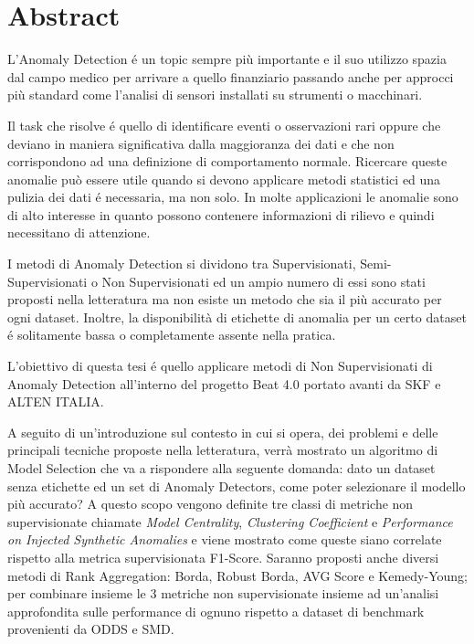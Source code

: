 \chapter*{Abstract}
L’Anomaly Detection é un topic sempre più importante e il suo utilizzo spazia dal campo medico per arrivare a quello finanziario passando anche per approcci più standard come l'analisi di sensori installati su strumenti o macchinari.

Il task che risolve é quello di identificare eventi o osservazioni rari oppure che deviano in maniera significativa dalla maggioranza dei dati e che non corrispondono ad una definizione di comportamento normale. Ricercare queste anomalie può essere utile quando si devono applicare metodi statistici ed una pulizia dei dati é necessaria, ma non solo. In molte applicazioni le anomalie sono di alto interesse in quanto possono contenere informazioni di rilievo e quindi necessitano di attenzione. 

I metodi di Anomaly Detection si dividono tra Supervisionati, Semi-Supervisionati o Non Supervisionati ed un ampio numero di essi sono stati proposti nella letteratura ma non esiste un metodo che sia il più accurato per ogni dataset. Inoltre, la disponibilità di etichette di anomalia per un certo dataset é solitamente bassa o completamente assente nella pratica. 


L’obiettivo di questa tesi é quello applicare metodi di Non Supervisionati di Anomaly Detection all'interno del progetto Beat 4.0 portato avanti da SKF e ALTEN ITALIA. 

A seguito di un'introduzione sul contesto in cui si opera, dei problemi e delle principali tecniche proposte nella letteratura, verrà mostrato un algoritmo di Model Selection che va a rispondere alla seguente domanda: dato un dataset senza etichette ed un set di Anomaly Detectors, come poter selezionare il modello più accurato? A questo scopo vengono definite tre classi di metriche non supervisionate chiamate \textit{Model Centrality}, \textit{Clustering Coefficient} e \textit{Performance on Injected Synthetic Anomalies} e viene mostrato come queste siano correlate rispetto alla metrica supervisionata F1-Score. Saranno proposti anche diversi metodi di Rank Aggregation: Borda, Robust Borda, AVG Score e Kemedy-Young; per combinare insieme le 3 metriche non supervisionate insieme ad un'analisi approfondita sulle performance di ognuno rispetto a dataset di benchmark provenienti da ODDS e SMD.

